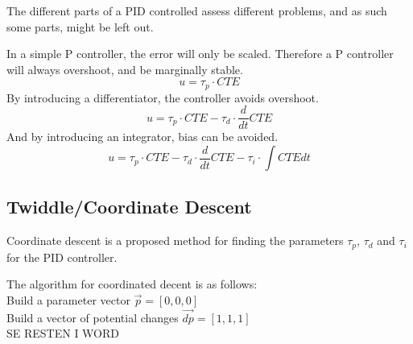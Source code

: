 \documentclass[Main]{subfiles}
\begin{document}
The different parts of a PID controlled assess different problems, and as such some parts, might be left out.

In a simple P controller, the error will only be scaled. 
Therefore a P controller will always overshoot, and be marginally stable.
\begin{equation}
	u = \tau_p \cdot CTE
\end{equation}
By introducing a differentiator, the controller avoids overshoot.
\begin{equation}
	u = \tau_p \cdot CTE - \tau_d \cdot \frac{d}{dt} CTE
\end{equation}
And by introducing an integrator, bias can be avoided.
\begin{equation}
	u = \tau_p \cdot CTE - \tau_d \cdot \frac{d}{dt} CTE - \tau_i \cdot \int CTE dt
\end{equation}

\subsection{Twiddle/Coordinate Descent}

Coordinate descent is a proposed method for finding the parameters $\tau_p$, $\tau_d$ and $\tau_i$ for the PID controller.

The algorithm for coordinated decent is as follows:\\
Build a parameter vector $\overrightarrow{p} = [0,0,0]$\\
Build a vector of potential changes $\overrightarrow{dp} = [1,1,1]$\\
SE RESTEN I WORD\\
\end{document}
